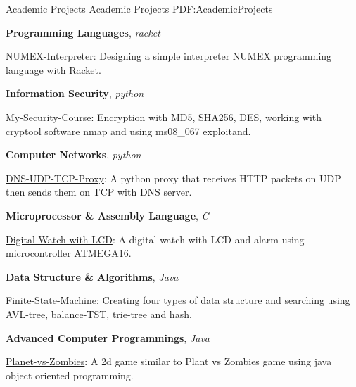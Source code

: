 \documentclass[letterpaper,MMMyyyy,nonstopmode]{resume}
\begin{document}
\begin{Body}


\Section
{Academic Projects}
{Academic Projects}
{PDF:AcademicProjects}

\BigGap
\BulletItem
\textbf{Programming Languages},
\textit{\small{racket}}
\begin{Detail}
\Item
\href{https://github.com/aliyazdi75/NUMEX-Interpreter}
{NUMEX-Interpreter}:
Designing a simple interpreter
NUMEX programming language with Racket.
\end{Detail}

\BigGap
\BulletItem
\textbf{Information Security},
\textit{\small{python}}
\begin{Detail}
\Item
\href{https://github.com/aliyazdi75/My-Security-Course}
{My-Security-Course}:
Encryption with MD5, SHA256, DES,
working with cryptool software nmap
and using ms08\_067 exploitand.
\end{Detail}

\BigGap
\BulletItem
\textbf{Computer Networks},
\textit{\small{python}}
\begin{Detail}
\Item
\href{https://github.com/aliyazdi75/DNS-UDP-TCP-Proxy}
{DNS-UDP-TCP-Proxy}:
A python proxy that receives HTTP packets on UDP
then sends them on TCP with DNS server.
\end{Detail}


\BigGap
\BulletItem
\textbf{Microprocessor \& Assembly Language},
\textit{\small{C}}
\begin{Detail}
\Item
\href{https://github.com/aliyazdi75/Digital-Watch-with-LCD}
{Digital-Watch-with-LCD}:
A digital watch with LCD and
alarm using microcontroller ATMEGA16.
\end{Detail}

\BigGap
\BulletItem
\textbf{Data Structure \& Algorithms},
\textit{\small{Java}}
\begin{Detail}
\Item
\href{https://github.com/aliyazdi75/Finite-State-Machine}
{Finite-State-Machine}:
Creating four types of data structure and searching using
AVL-tree, balance-TST, trie-tree and hash.
\end{Detail}

\BigGap
\BulletItem
\textbf{Advanced Computer Programmings},
\textit{\small{Java}}
\begin{Detail}
\Item
\href{https://github.com/aliyazdi75/Planet\_vs\_Zombies}
{Planet-vs-Zombies}:
A 2d game similar to Plant vs Zombies game
using java object oriented programming.
\end{Detail}


\end{Body}
\end{document}
